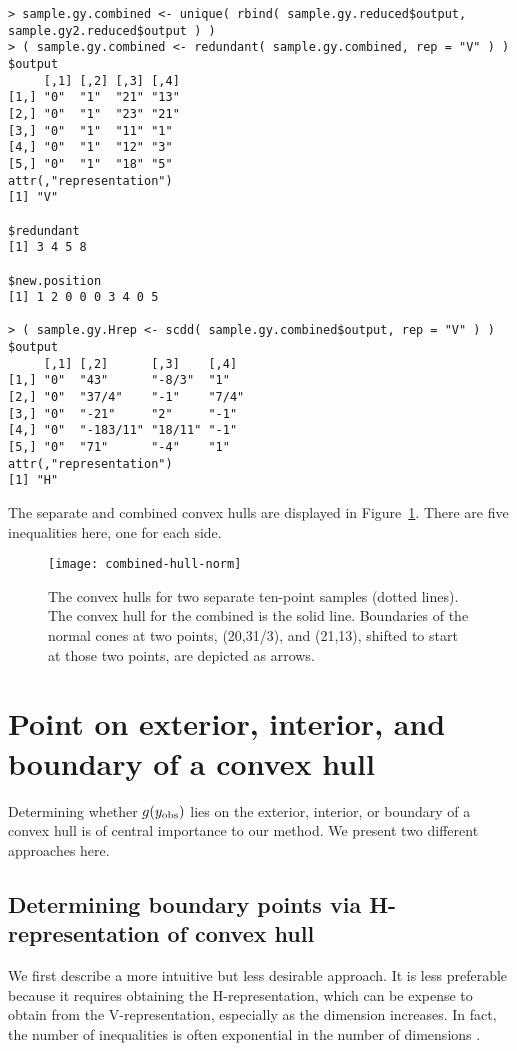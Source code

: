 \begin{verbatim}
> sample.gy.combined <- unique( rbind( sample.gy.reduced$output, 
sample.gy2.reduced$output ) )
> ( sample.gy.combined <- redundant( sample.gy.combined, rep = "V" ) )
$output
     [,1] [,2] [,3] [,4]
[1,] "0"  "1"  "21" "13"
[2,] "0"  "1"  "23" "21"
[3,] "0"  "1"  "11" "1" 
[4,] "0"  "1"  "12" "3" 
[5,] "0"  "1"  "18" "5" 
attr(,"representation")
[1] "V"

$redundant
[1] 3 4 5 8

$new.position
[1] 1 2 0 0 0 3 4 0 5

> ( sample.gy.Hrep <- scdd( sample.gy.combined$output, rep = "V" ) )
$output
     [,1] [,2]      [,3]    [,4] 
[1,] "0"  "43"      "-8/3"  "1"  
[2,] "0"  "37/4"    "-1"    "7/4"
[3,] "0"  "-21"     "2"     "-1" 
[4,] "0"  "-183/11" "18/11" "-1" 
[5,] "0"  "71"      "-4"    "1"  
attr(,"representation")
[1] "H"
\end{verbatim}

The separate and combined convex hulls are displayed in Figure~\ref{F:combined-hull}.
There are five inequalities here, one for each side.
\begin{figure}[h]
\begin{center}
\texttt{[image: combined-hull-norm]}
\end{center}
\caption{The convex hulls for two separate ten-point samples (dotted lines).  The 
convex hull for the combined is the solid line.  Boundaries of the normal cones
at two points, (20,31/3), and (21,13), shifted to start at those two points, are depicted as arrows.}
\label{F:combined-hull}
\end{figure}


\section{Point on exterior, interior, and boundary of a convex hull}
Determining whether $g(y_{\text{obs}})$ lies on the exterior, interior, or boundary
of a convex hull is of central importance to our method.  We present two 
different approaches here.

\subsection{Determining boundary points via H-representation of convex hull}
\label{S:H-rep inquiry}
We first describe a more intuitive but less desirable approach.  It is less preferable because it requires obtaining the H-representation, 
which can be expense to obtain from the V-representation, 
especially as the dimension increases.  In fact, the number of inequalities 
is often exponential in the number of dimensions \citep{Fukuda:2008}.

